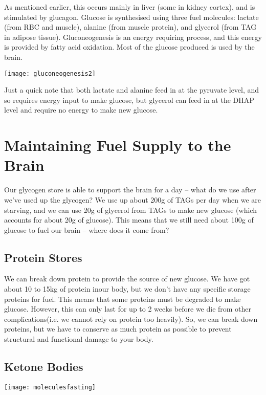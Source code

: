 As mentioned earlier, this occurs mainly in liver (some in kidney cortex), and is stimulated by glucagon.
Glucose is synthesised using three fuel molecules: lactate (from RBC and muscle), alanine (from muscle protein), and glycerol (from TAG in adipose tissue).
Gluconeogenesis is an energy requiring process, and this energy is provided by fatty acid oxidation.
Most of the glucose produced is used by the brain.

\begin{center}
\texttt{[image: gluconeogenesis2]}
\end{center}

Just a quick note that both lactate and alanine feed in at the pyruvate level, and so requires energy input to make glucose, but glycerol can feed in at the DHAP level and require no energy to make new glucose.

\section{Maintaining Fuel Supply to the Brain}

Our glycogen store is able to support the brain for a day -- what do we use after we've used up the glycogen?
We use up about 200g of TAGs per day when we are starving, and we can use 20g of glycerol from TAGs to make new glucose (which accounts for about 20g of glucose).
This means that we still need about 100g of glucose to fuel our brain -- where does it come from?

\subsection{Protein Stores}

We can break down protein to provide the source of new glucose.
We have got about 10 to 15kg of protein inour body, but we don't have any specific storage proteins for fuel.
This means that some proteins must be degraded to make glucose.
However, this can only last for up to 2 weeks before we die from other complications(i.e. we cannot rely on protein too heavily).
So, we can break down proteins, but we have to conserve as much protein as possible to prevent structural and functional damage to your body.

\subsection{Ketone Bodies}

\begin{center}
\texttt{[image: moleculesfasting]}
\end{center}

